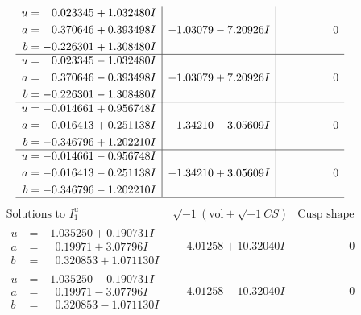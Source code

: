 \documentclass[1p]{elsarticle_modified}
\theoremstyle{definition}
\newcommand{\I}{\sqrt{-1}}
\begin{document}
$$\begin{array}{c|c|c}
\begin{aligned}
u &= \phantom{-}0.023345 + 1.032480 I \\
a &= \phantom{-}0.370646 + 0.393498 I \\
b &= -0.226301 + 1.308480 I\end{aligned}
 & -1.03079 - 7.20926 I & \phantom{-0.000000 } 0 \\ \hline\begin{aligned}
u &= \phantom{-}0.023345 - 1.032480 I \\
a &= \phantom{-}0.370646 - 0.393498 I \\
b &= -0.226301 - 1.308480 I\end{aligned}
 & -1.03079 + 7.20926 I & \phantom{-0.000000 } 0 \\ \hline\begin{aligned}
u &= -0.014661 + 0.956748 I \\
a &= -0.016413 + 0.251138 I \\
b &= -0.346796 + 1.202210 I\end{aligned}
 & -1.34210 - 3.05609 I & \phantom{-0.000000 } 0 \\ \hline\begin{aligned}
u &= -0.014661 - 0.956748 I \\
a &= -0.016413 - 0.251138 I \\
b &= -0.346796 - 1.202210 I\end{aligned}
 & -1.34210 + 3.05609 I & \phantom{-0.000000 } 0\\
 \hline 
 \end{array}$$\newpage$$\begin{array}{c|c|c}  
\text{Solutions to }I^u_{1}& \I (\text{vol} + \sqrt{-1}CS) & \text{Cusp shape}\\
 \hline 
\begin{aligned}
u &= -1.035250 + 0.190731 I \\
a &= \phantom{-}0.19971 + 3.07796 I \\
b &= \phantom{-}0.320853 + 1.071130 I\end{aligned}
 & \phantom{-}4.01258 + 10.32040 I & \phantom{-0.000000 } 0 \\ \hline\begin{aligned}
u &= -1.035250 - 0.190731 I \\
a &= \phantom{-}0.19971 - 3.07796 I \\
b &= \phantom{-}0.320853 - 1.071130 I\end{aligned}
 & \phantom{-}4.01258 - 10.32040 I & \phantom{-0.000000 } 0 \\ \hline\begin{aligned}

\end{aligned}
\end{array}$$
\end{document}
